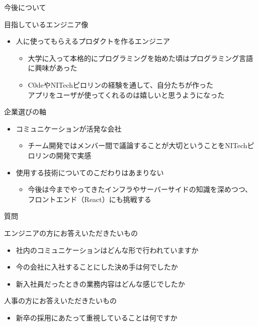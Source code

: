 \documentclass[12pt, unicode]{beamer}
\begin{document}
\begin{frame}{今後について}
  \begin{block}{目指しているエンジニア像}
    \begin{itemize}
      \item 人に使ってもらえるプロダクトを作るエンジニア
      \begin{itemize}
        \item 大学に入って本格的にプログラミングを始めた頃はプログラミング言語に興味があった
        \item C0deやNITechピロリンの経験を通して、自分たちが作った\\アプリをユーザが使ってくれるのは嬉しいと思うようになった
      \end{itemize}
    \end{itemize}
  \end{block}

  \begin{block}{企業選びの軸}
    \begin{itemize}
      \item コミュニケーションが活発な会社
      \begin{itemize}
        \item チーム開発ではメンバー間で議論することが大切ということをNITechピロリンの開発で実感
      \end{itemize}
      \item 使用する技術についてのこだわりはあまりない
      \begin{itemize}
        \item 今後は今までやってきたインフラやサーバーサイドの知識を深めつつ、フロントエンド（React）にも挑戦する
      \end{itemize}
    \end{itemize}
  \end{block}
\end{frame}

\begin{frame}{質問}
  \begin{block}{エンジニアの方にお答えいただきたいもの}
    \begin{itemize}
      \item 社内のコミュニケーションはどんな形で行われていますか
      \item 今の会社に入社することにした決め手は何でしたか
      \item 新入社員だったときの業務内容はどんな感じでしたか
    \end{itemize}
  \end{block}

  \begin{block}{人事の方にお答えいただきたいもの}
    \begin{itemize}
      \item 新卒の採用にあたって重視していることは何ですか
    \end{itemize}
  \end{block}
\end{frame}
\end{document}
